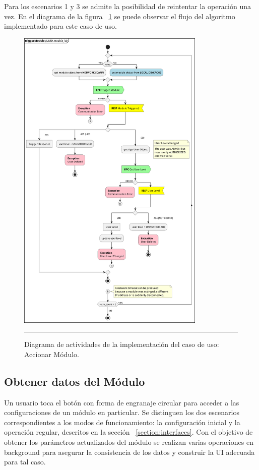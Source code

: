 Para los escenarios 1 y 3 se admite la posibilidad de reintentar la operación una vez.
En el diagrama de la figura ~\ref{fig:act_trigger} se puede observar el flujo del algoritmo implementado para este caso de uso.

\begin{figure}[htbp]
	\centering
	\includegraphics[width=0.8\textwidth]{Figures/iter1/ACT_trigger_module.png}
	\rule{35em}{1pt}
	\caption[Class Diagram]{Diagrama de actividades de la implementación del caso de uso: Accionar Módulo.}
	\label{fig:act_trigger}
\end{figure}

\subsection{Obtener datos del Módulo}
Un usuario toca el botón con forma de engranaje circular para acceder a las configuraciones de un módulo en particular.
Se distinguen los dos escenarios correspondientes a los modos de funcionamiento: la configuración inicial y la operación regular, descritos en la sección ~\ref{section:interfaces}.
Con el objetivo de obtener los parámetros actualizados del módulo se realizan varias operaciones en background para asegurar la consistencia de los datos y construir la UI adecuada para tal caso.

